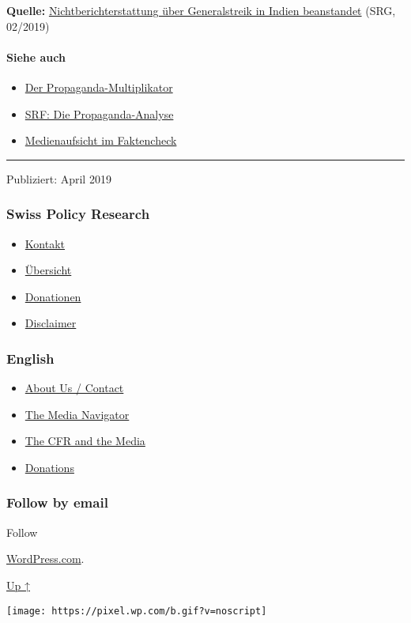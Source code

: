 \textbf{Quelle:}
\href{https://www.srgd.ch/de/aktuelles/news/2019/02/19/nichtberichterstattung-uber-generalstreik-indien-beanstandet/}{Nichtberichterstattung
über Generalstreik in Indien beanstandet} (SRG, 02/2019)

\hypertarget{siehe-auch}{%
\paragraph{Siehe auch}\label{siehe-auch}}

\begin{itemize}
\tightlist
\item
  \href{https://swprs.org/der-propaganda-multiplikator/}{Der
  Propaganda-Multiplikator}
\item
  \href{https://swprs.org/srf-propaganda-analyse/}{SRF: Die
  Propaganda-Analyse}
\item
  \href{https://swprs.org/srf-ombudsstelle-im-faktencheck/}{Medienaufsicht
  im Faktencheck}
\end{itemize}

\begin{center}\rule{0.5\linewidth}{\linethickness}\end{center}

Publiziert: April 2019

\hypertarget{swiss-policy-research}{%
\subsubsection{Swiss Policy Research}\label{swiss-policy-research}}

\begin{itemize}
\tightlist
\item
  \href{https://swprs.org/kontakt/}{Kontakt}
\item
  \href{https://swprs.org/uebersicht/}{Übersicht}
\item
  \href{https://swprs.org/donationen/}{Donationen}
\item
  \href{https://swprs.org/disclaimer/}{Disclaimer}
\end{itemize}

\hypertarget{english}{%
\subsubsection{English}\label{english}}

\begin{itemize}
\tightlist
\item
  \href{https://swprs.org/contact/}{About Us / Contact}
\item
  \href{https://swprs.org/media-navigator/}{The Media Navigator}
\item
  \href{https://swprs.org/the-american-empire-and-its-media/}{The CFR
  and the Media}
\item
  \href{https://swprs.org/donations/}{Donations}
\end{itemize}

\hypertarget{follow-by-email}{%
\subsubsection{Follow by email}\label{follow-by-email}}

Follow

\href{https://wordpress.com/?ref=footer_custom_com}{WordPress.com}.

\protect\hyperlink{}{Up ↑}

\texttt{[image: https://pixel.wp.com/b.gif?v=noscript]}
